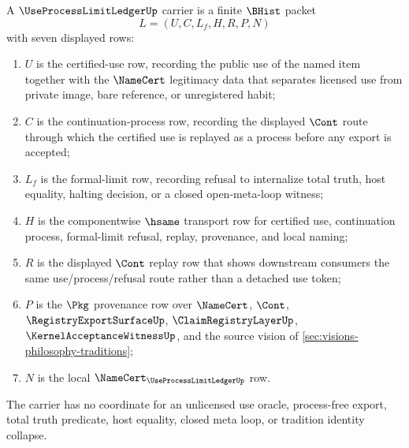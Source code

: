 \begin{definition}
\label{def:use-process-limit-ledger-carrier}
A $\UseProcessLimitLedgerUp$ carrier is a finite $\BHist$ packet
$$
L=(U,C,L_f,H,R,P,N)
$$
with seven displayed rows:
\begin{enumerate}
\item $U$ is the certified-use row, recording the public use of the named item together with the $\NameCert$ legitimacy data that separates licensed use from private image, bare reference, or unregistered habit;
\item $C$ is the continuation-process row, recording the displayed $\Cont$ route through which the certified use is replayed as a process before any export is accepted;
\item $L_f$ is the formal-limit row, recording refusal to internalize total truth, host equality, halting decision, or a closed open-meta-loop witness;
\item $H$ is the componentwise $\hsame$ transport row for certified use, continuation process, formal-limit refusal, replay, provenance, and local naming;
\item $R$ is the displayed $\Cont$ replay row that shows downstream consumers the same use/process/refusal route rather than a detached use token;
\item $P$ is the $\Pkg$ provenance row over $\NameCert$, $\Cont$, $\RegistryExportSurfaceUp$, $\ClaimRegistryLayerUp$, $\KernelAcceptanceWitnessUp$, and the source vision of \autoref{sec:visions-philosophy-traditions};
\item $N$ is the local $\NameCert_{\UseProcessLimitLedgerUp}$ row.
\end{enumerate}
The carrier has no coordinate for an unlicensed use oracle, process-free export, total truth predicate, host equality, closed meta loop, or tradition identity collapse.
\end{definition}

